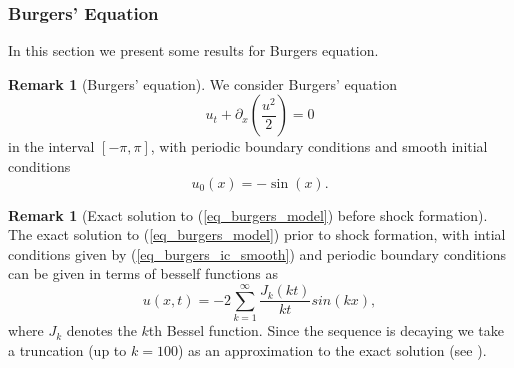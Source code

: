 \documentclass[12pt,a4paper]{article}
\numberwithin{equation}{section}
\theoremstyle{definition}
\newcommand{\qp}[1]{\left(#1\right)}
\newcommand{\qb}[1]{\left[#1\right]}
\newtheorem{Rem}[subsection]{Remark}
\begin{document}
\subsubsection{Burgers' Equation}
In this section we present some results for Burgers equation.
\begin{Rem}[Burgers' equation] We consider Burgers' equation
	\begin{equation}\label{eq_burgers_model}
u_t+\partial_x\qp{\frac{u^2}{2}}=0
\end{equation}
in the interval $\qb{-\pi, \pi}$, with periodic boundary conditions and smooth initial conditions
\begin{equation}\label{eq_burgers_ic_smooth}
u_0\qp{x}=-\sin \qp{x}.
\end{equation}
\end{Rem}
\begin{Rem}[Exact solution to (\ref{eq_burgers_model}) before shock formation]
The exact solution to (\ref{eq_burgers_model}) prior to shock formation, with intial conditions given by (\ref{eq_burgers_ic_smooth}) and periodic boundary conditions can be given in terms of besself functions as 
\begin{equation}
u\qp{x,t}= -2\sum_{k=1}^{\infty}\frac{J_k\qp{kt}}{kt}sin\qp{kx},
\end{equation}
where $J_k$ denotes the $k$th Bessel function.  Since the sequence is decaying we take a truncation (up to $k=100$) as an approximation to the exact solution (see \cite{giesselmann2015posteriori}).
\end{Rem}
\end{document}
